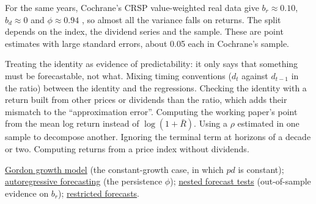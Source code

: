 \begin{qfresult}
For the same years, Cochrane's CRSP value-weighted real data give $b_r\approx0.10$, $b_d\approx0$ and $\phi\approx0.94$ \citep[p.~1540]{wide-cochrane-dog}, so almost all the variance falls on returns. The split depends on the index, the dividend series and the sample. These are point estimates with large standard errors, about 0.05 each in Cochrane's sample.

 Treating the identity as evidence of predictability: it only says that something must be forecastable, not what. Mixing timing conventions ($d_t$ against $d_{t-1}$ in the ratio) between the identity and the regressions. Checking the identity with a return built from other prices or dividends than the ratio, which adds their mismatch to the ``approximation error''. Computing the working paper's point from the mean log return instead of $\log(1+\bar R)$. Using a $\rho$ estimated in one sample to decompose another. Ignoring the terminal term at horizons of a decade or two. Computing returns from a price index without dividends.

 \hyperref[meth:gordon-growth-model]{Gordon growth model} (the constant-growth case, in which $pd$ is constant); \hyperref[meth:autoregressive-forecasting]{autoregressive forecasting} (the persistence $\phi$); \hyperref[meth:nested-forecast-tests]{nested forecast tests} (out-of-sample evidence on $b_r$); \hyperref[meth:restricted-forecast-value]{restricted forecasts}.

\end{qfresult}

